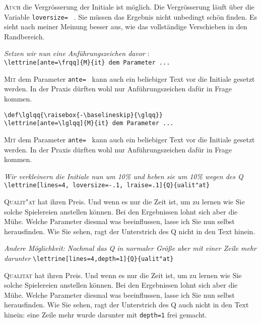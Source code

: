 \documentclass[12pt,a4paper]{article}
\begin{document}
\lettrine[lines=3, lhang=0.33, loversize=0.25]{A}{uch}
die Vergr\"osserung der Initiale ist m\"oglich. Die Vergr\"osserung l\"auft
\"uber die Variable \verb+loversize= + . Sie m\"ussen das Ergebnis nicht
unbedingt sch\"on finden. Es sieht nach meiner Meinung besser aus, wie das
vollst\"andige Verschieben in den Randbereich.

\vspace{\baselineskip}
\textit{Setzen wir nun eine %
         Anf\"uhrungszeichen davor} :\\
\verb+\lettrine[ante=\frqq]{M}{it} dem Parameter ...+

\lettrine[ante=\frqq]{M}{it} dem Parameter \verb+ante= + kann auch ein
beliebiger Text vor die Initiale gesetzt werden. In der Praxis d\"urften
wohl nur Anf\"uhrungszeichen daf\"ur in Frage kommen.

\vspace{\baselineskip}
\verb+\def\lglqq{\raisebox{-\baselineskip}{\glqq}}+\\
\verb+\lettrine[ante=\lglqq]{M}{it} dem Parameter ...+
\def\lglqq{\raisebox{-\baselineskip}{\glqq}}

\lettrine[ante=\lglqq]{M}{it} dem Parameter \verb+ante= + kann auch ein
beliebiger Text vor die Initiale gesetzt werden. In der Praxis d\"urften
wohl nur Anf\"uhrungszeichen daf\"ur in Frage kommen.

\newpage
\textit{Wir verkleinern die Initiale nun um 10\% und heben sie
um 10\% wegen des {\glqq}Q{\grqq}}
\verb+\lettrine[lines=4, loversize=-.1, lraise=.1]{Q}{ualit"at}+

\lettrine[lines=4, loversize=-.1, lraise=.1]{Q}{ualit"at} hat ihren
Preis.  Und wenn es nur die Zeit ist, um zu lernen wie Sie solche Spielereien
anstellen k\"onnen. Bei den Ergebnissen lohnt sich aber die M\"uhe. Welche
Parameter diesmal was beeinflussen, lasse ich Sie nun selbst herausfinden.
Wie Sie sehen, ragt der Unterstrich des {\glqq}Q{\grqq} nicht in den Text
hinein.

\vspace{.5\baselineskip}
\textit{Andere M\"oglichkeit: Nochmal das {\glqq}Q{\grqq} in normaler
  Gr\"o\ss{}e aber mit einer Zeile mehr darunter}
\verb+\lettrine[lines=4,depth=1]{Q}{ualit"at}+

\lettrine[lines=4,depth=1]{Q}{ualit\"at} hat ihren Preis.  Und wenn es nur die
Zeit ist, um zu lernen wie Sie solche Spielereien anstellen k\"onnen. Bei den
Ergebnissen lohnt sich aber die M\"uhe. Welche Parameter diesmal was
beeinflussen, lasse ich Sie nun selbst herausfinden. Wie Sie sehen, ragt der
Unterstrich des {\glqq}Q{\grqq} auch nicht in den Text hinein: eine Zeile mehr
wurde darunter mit \verb+depth=1+ frei gemacht.
\end{document}

